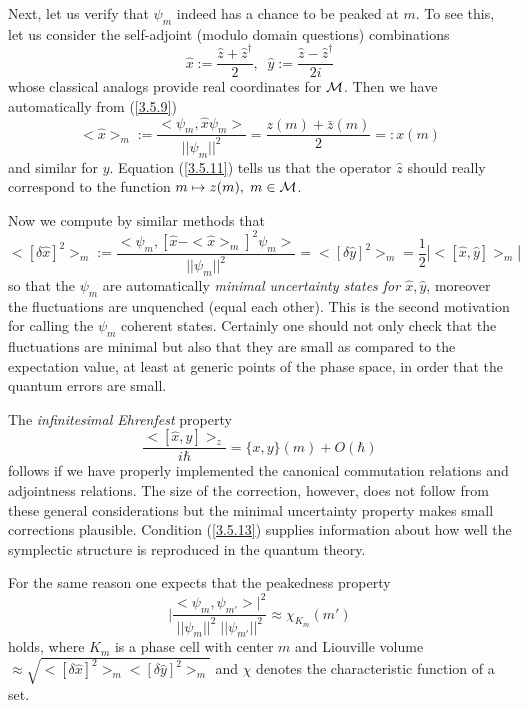 \documentclass[12pt]{report}
\def\be{\begin{equation}}
\def\ee{\end{equation}}
\begin{document}
Next, let us verify that $\psi_m$ indeed has a chance to be peaked at
$m$. To see this, let us consider the self-adjoint (modulo domain 
questions) combinations 
\be \label{3.5.10}
\hat{x}:=\frac{\hat{z}+\hat{z}^\dagger}{2},\;\; 
\hat{y}:=\frac{\hat{z}-\hat{z}^\dagger}{2i}
\ee
whose classical analogs provide real coordinates for $\cal M$.
Then we have automatically from (\ref{3.5.9})
\be \label{3.5.11}
<\hat{x}>_m:=\frac{<\psi_m,\hat{x}\psi_m>}{||\psi_m||^2}=
\frac{z(m)+\bar{z}(m)}{2}=:x(m)
\ee 
and similar for $y$. Equation (\ref{3.5.11}) tells us that the operator
$\hat{z}$ should really correspond to the function $m\mapsto z(m),\;m\in 
{\cal M}$.

Now we compute by similar methods that
\be \label{3.5.12}
<[\delta\hat{x}]^2>_m
:=\frac{<\psi_m,[\hat{x}-<\hat{x}>_m]^2\psi_m>}{||\psi_m||^2}
=<[\delta\hat{y}]^2>_m
=\frac{1}{2}|<[\hat{x},\hat{y}]>_m|
\ee
so that the $\psi_m$ are automatically {\it minimal uncertainty states for
$\hat{x},\hat{y}$}, moreover the fluctuations are unquenched (equal each 
other). This is 
the second motivation for calling the $\psi_m$ coherent states. Certainly
one should not only check that the fluctuations are minimal but also that 
they are small as compared to the expectation value, at least at generic 
points of the phase space, in order that the quantum errors are small. 

The {\it infinitesimal Ehrenfest} property
\be \label{3.5.13}
\frac{<[\hat{x},\hat{y}]>_z}{i\hbar}=
\{x,y\}(m)+O(\hbar)
\ee
follows if we have properly implemented the canonical commutation 
relations and 
adjointness relations. The size of the correction, however, does not 
follow from these general considerations but the minimal uncertainty
property makes small corrections plausible. Condition (\ref{3.5.13}) 
supplies information about how well the symplectic structure is reproduced
in the quantum theory.  

For the same reason one 
expects that the peakedness property
\be \label{3.5.14}
|\frac{<\psi_m,\psi_{m'}>|^2}{||\psi_m||^2\;||\psi_{m'}||^2}
\approx \chi_{K_m}(m')
\ee
holds, where $K_m$ is a phase cell with center $m$ and Liouville volume  
$\approx\sqrt{<[\delta \hat{x}]^2>_m <[\delta \hat{y}]^2>_m}$ 
and $\chi$ denotes the characteristic function of a set.
\end{document}
